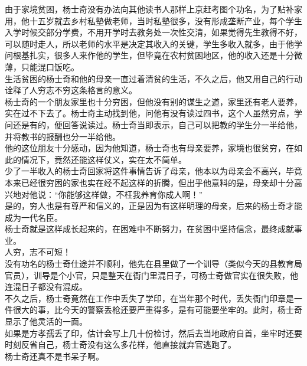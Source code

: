 \begin{multicols}{\theparacolNo}
由于家境贫困，杨士奇没有办法向其他读书人那样上京赶考图个功名，为了贴补家用，他十五岁就去乡村私塾做老师，当时私塾很多，没有形成垄断产业，每个学生入学时候交部分学费，不用开学时去教务处一次性交清，如果觉得先生教得不好，可以随时走人，所以老师的水平是决定其收入的关键，学生多收入就多，由于他学问根基扎实，很多人来作他的学生，但毕竟在农村贫困地区，他的收入还是十分微薄，只能混口饭吃。\\

生活贫困的杨士奇和他的母亲一直过着清贫的生活，不久之后，他又用自己的行动诠释了人穷志不穷这条格言的意义。\\

杨士奇的一个朋友家里也十分穷困，但他没有别的谋生之道，家里还有老人要养，实在过不下去了。杨士奇主动找到他，问他有没有读过四书，这个人虽然穷点，学问还是有的，便回答说读过。杨士奇当即表示，自己可以把教的学生分一半给他，并将教书的报酬也分一半给他。\\

他的这位朋友十分感动，因为他知道，杨士奇也有母亲要养，家境也很贫穷，在如此的情况下，竟然还能这样仗义，实在太不简单。\\

少了一半收入的杨士奇回家将这件事情告诉了母亲，他本以为母亲会不高兴，毕竟本来已经很穷困的家也实在经不起这样的折腾，但出乎他意料的是，母亲却十分高兴地对他说：“你能够这样做，不枉我养育你成人啊！”\\

是的，穷人也是有尊严和信义的，正是因为有这样明理的母亲，后来的杨士奇才能成为一代名臣。\\

杨士奇就是这样成长起来的，在困难中不断努力，在贫困中坚持信念，最终成就事业。\\

人穷，志不可短！\\

没有功名的杨士奇仕途并不顺利，他先在县里做了一个训导（类似今天的县教育局官员），训导是个小官，只是整天在衙门里混日子，可杨士奇做官实在很失败，他连混日子都没有混成。\\

不久之后，杨士奇竟然在工作中丢失了学印，在当年那个时代，丢失衙门印章是一件很大的事，比今天的警察丢枪还要严重得多，是有可能要坐牢的。此时，杨士奇显示了他灵活的一面。\\

如果是方孝孺丢了印，估计会写上几十份检讨，然后去当地政府自首，坐牢时还要时刻反省自己，杨士奇没有这么多花样，他直接就弃官逃跑了。\\

杨士奇还真不是书呆子啊。\\


\end{multicols}
